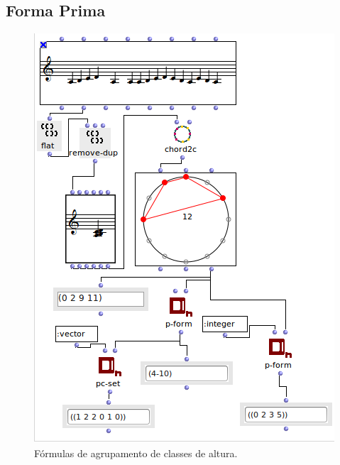 \documentclass[
	12pt,				%
	openright,			%
	twoside,			%
	a4paper,			%
	english,			%
	french,				%
	spanish,			%
	brazil				%
	]{abntex2}
\begin{document}
\pagebreak
\subsection{Forma Prima} 


\begin{figure}[h]
	\caption{\label{fig_grafico}Fórmulas de agrupamento de classes de altura. }
	\begin{center}
	    \includegraphics[scale=0.7]{OM_settheory/forma_prima_forte_vector.png}
	\end{center}
\end{figure}
\end{document}

